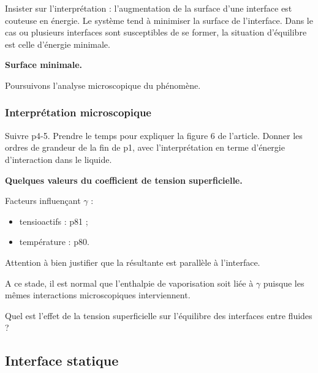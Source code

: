Insister sur l'interprétation : l'augmentation de la surface d'une interface est couteuse en énergie.
Le système tend à minimiser la surface de l'interface.
Dans le cas ou plusieurs interfaces sont susceptibles de se former, la situation d'équilibre est celle d'énergie minimale.

\begin{slide}
\textbf{Surface minimale.}
\end{slide}

\begin{transition}
Poursuivons l'analyse microscopique du phénomène.
\end{transition}

\subsubsection{Interprétation microscopique}

Suivre \cite{Marchand2011} p4-5.
Prendre le temps pour expliquer la figure 6 de l'article.
Donner les ordres de grandeur de la fin de \cite{Marchand2011} p1, avec l'interprétation en terme d'énergie d'interaction dans le liquide.
\begin{slide}
\textbf{Quelques valeurs du coefficient de tension superficielle.}
\end{slide}

Facteurs influençant $\gamma$ :
\begin{itemize}
\item tensioactifs : \cite{Rabaud2019} p81 ;
\item température : \cite{Rabaud2019} p80.
\end{itemize}

\begin{remarque}
Attention à bien justifier que la résultante est parallèle à l'interface.

\noindent
A ce stade, il est normal que l'enthalpie de vaporisation soit liée à $\gamma$ puisque les mêmes interactions microscopiques interviennent.
\end{remarque}

\begin{transition}
Quel est l'effet de la tension superficielle sur l'équilibre des interfaces entre fluides ?
\end{transition}

\subsection{Interface statique}

